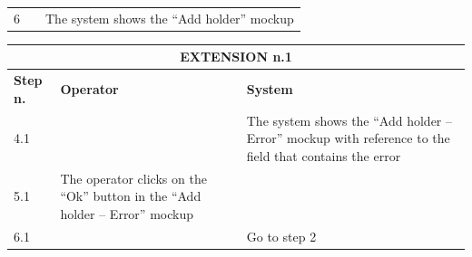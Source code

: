 {{{\begin{center}
\begin{tabular}{|p{2cm}|p{6cm}|p{6cm}|}
				\vspace{1mm} \vspace{1mm} \\
			\hline
				\vspace{1mm} 6 \vspace{1mm} &
				\vspace{1mm} \vspace{1mm} & 
				\vspace{1mm} The system shows the “Add holder”  mockup \vspace{1mm} \\
			\hline
			\end{tabular}

			\begin{tabular}{|p{2cm}|p{6cm}|p{6cm}|}
			\hline
				\multicolumn{3}{|c|}{EXTENSION n.1}\\
			\hline
				\centering \vspace{1mm} \bfseries{Step n.} \vspace{1mm} & \vspace{1mm} \bfseries{Operator} \vspace{1mm} & \vspace{1mm} \bfseries{System} \vspace{1mm}\\
			\hline
				\vspace{1mm} 4.1 \vspace{1mm} &
				\vspace{1mm} \vspace{1mm} & 
				\vspace{1mm} The system shows the “Add holder – Error”  mockup with reference to the field that contains the error \vspace{1mm} \\
			\hline
				\vspace{1mm} 5.1\vspace{1mm} &
				\vspace{1mm} The operator clicks on the “Ok” button in the “Add holder – Error”  mockup \vspace{1mm} & 
				\vspace{1mm} \vspace{1mm} \\
			\hline
				\vspace{1mm} 6.1\vspace{1mm} &
				\vspace{1mm} \vspace{1mm} & 
				\vspace{1mm} Go to step 2\vspace{1mm} \\
			\hline
			\end{tabular}


\end{center}}}}
